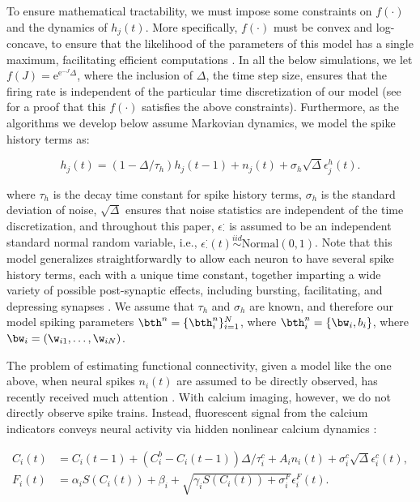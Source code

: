 \noindent To ensure mathematical tractability, we must impose some constraints on $f(\cdot)$ and the dynamics of $h_j(t)$.  More specifically, $f(\cdot)$ must be convex and log-concave, to ensure that the likelihood of the parameters of this model has a single maximum, facilitating efficient computations \cite{PAN03d}.  In all the below simulations, we let $f(J)=\text{e}^{\text{e}^{-J}\Delta}$, where the inclusion of $\Delta$, the time step size, ensures that the firing rate is independent of the particular time discretization of our model (see \cite{??} for a proof that this $f(\cdot)$ satisfies the above constraints).  Furthermore, as the algorithms we develop below assume Markovian dynamics, we model the spike history terms as:

\begin{equation} \label{eqn:h:definition}
h_j(t) = (1- \Delta/\tau_h) h_j(t-1) +n_j(t) + \sigma_h \sqrt{\Delta} \epsilon^h_j(t).
\end{equation}

\noindent where $\tau_h$ is the decay time constant for spike history terms, $\sigma_h$ is the standard deviation of noise, $\sqrt{\Delta}$ ensures that noise statistics are independent of the time discretization, and throughout this paper, $\epsilon_\cdot^\cdot$ is assumed to be an independent standard normal random variable, i.e., $\epsilon_{\cdot}^{\cdot}(t) \overset{iid}{\sim} \text{Normal}(0,1)$.  Note that this model generalizes straightforwardly to allow each neuron to have several spike history terms, each with a unique time constant, together imparting a wide variety of possible post-synaptic effects, including bursting, facilitating, and depressing synapses \cite{PAN03d}.  We assume that $\tau_h$ and $\sigma_h$ are known, and therefore our model spiking parameters $\bth^n=\{\bth^n_i\}_{i=1}^N$, where $\bth^n_i=\{\bw_i,b_i\}$, where $\bw_i=(\w_{i1},\ldots, \w_{iN})$.

The problem of estimating functional connectivity, given a model like the one above, when neural spikes $n_i(t)$ are assumed to be directly observed, has recently received much attention \cite{PILL07}. With calcium imaging, however, we do not directly observe spike trains. Instead, fluorescent signal from the calcium indicators conveys neural activity via hidden nonlinear calcium dynamics \cite{Vogelstein2009}: 

\begin{align} \label{eqn:ca:definition} %
C_i(t) &= C_i(t-1) + (C_i^b-C_i(t-1)) \Delta/\tau^c_i + A_i n_i(t)+\sigma^c_i \sqrt{\Delta} \epsilon^c_i(t), \\
F_i(t) &= \alpha_i S(C_i(t)) + \beta_i + \sqrt{\gamma_i S(C_i(t)) + \sigma^F_i} \epsilon^F_i(t). \label{eqn:F:definition}
\end{align}

